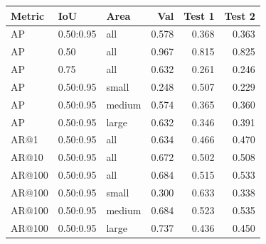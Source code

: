 \begin{tabular}{lllrrr}
\toprule
Metric & IoU & Area & Val & Test 1 & Test 2 \\
\midrule
AP & 0.50:0.95 & all & 0.578 & 0.368 & 0.363 \\
AP & 0.50 & all & 0.967 & 0.815 & 0.825 \\
AP & 0.75 & all & 0.632 & 0.261 & 0.246 \\
AP & 0.50:0.95 & small & 0.248 & 0.507 & 0.229 \\
AP & 0.50:0.95 & medium & 0.574 & 0.365 & 0.360 \\
AP & 0.50:0.95 & large & 0.632 & 0.346 & 0.391 \\
AR@1 & 0.50:0.95 & all & 0.634 & 0.466 & 0.470 \\
AR@10 & 0.50:0.95 & all & 0.672 & 0.502 & 0.508 \\
AR@100 & 0.50:0.95 & all & 0.684 & 0.515 & 0.533 \\
AR@100 & 0.50:0.95 & small & 0.300 & 0.633 & 0.338 \\
AR@100 & 0.50:0.95 & medium & 0.684 & 0.523 & 0.535 \\
AR@100 & 0.50:0.95 & large & 0.737 & 0.436 & 0.450 \\
\bottomrule
\end{tabular}
